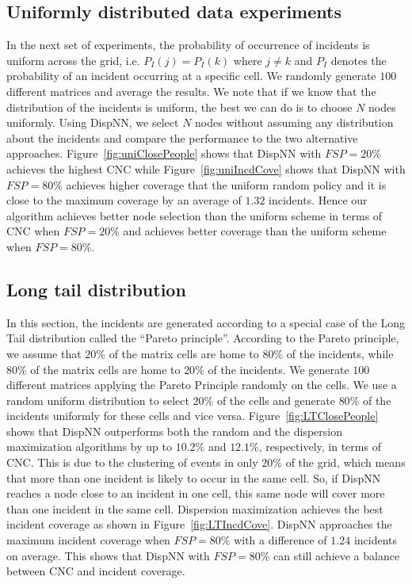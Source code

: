 \documentclass{acm_proc_article-sp}
\begin{document}
\subsection{Uniformly distributed data experiments}
In the next set of experiments, the probability of occurrence of incidents is uniform across the grid, i.e. $P_I (j) = P_I (k)$ where $j \neq k$ and $P_I$ denotes the probability of an incident occurring at a specific cell. We randomly generate $100$ different matrices and average the results. We note that if we know that the distribution of the incidents is uniform, the best we can do is to choose $N$ nodes uniformly. Using DispNN, we select $N$ nodes without assuming any distribution about the incidents and compare the performance to the two alternative approaches. Figure~\ref{fig:uniClosePeople} shows that DispNN with $FSP = 20\%$ achieves the highest CNC while Figure~\ref{fig:uniIncdCove} shows that DispNN with $FSP = 80\%$ achieves higher coverage that the uniform random policy and it is close to the maximum coverage by an average of $1.32$ incidents. Hence our algorithm achieves better node selection than the uniform scheme in terms of CNC when $FSP = 20\%$ and achieves better coverage than the uniform scheme when $FSP = 80\%$.

\subsection{Long tail distribution}
In this section, the incidents are generated according to a special case of the Long Tail distribution called the ``Pareto principle''. According to the Pareto principle, we assume that $20\%$ of the matrix cells are home to $80\%$ of the incidents, while $80\%$ of the matrix cells are home to $20\%$ of the incidents. We generate $100$ different matrices applying the Pareto Principle randomly on the cells. We use a random uniform distribution to select $20\%$ of the cells and generate $80\%$ of the incidents uniformly for these cells and vice versa. Figure~\ref{fig:LTClosePeople} shows that DispNN outperforms both the random and the dispersion maximization algorithms by up to $10.2\%$ and $12.1\%$, respectively, in terms of CNC. This is due to the clustering of events in only $20\%$ of the grid, which means that more than one incident is likely to occur in the same cell. So, if DispNN reaches a node close to an incident in one cell, this same node will cover more than one incident in the same cell. Dispersion maximization achieves the best incident coverage as shown in Figure~\ref{fig:LTIncdCove}. DispNN approaches the maximum incident coverage when $FSP = 80\%$ with a difference of $1.24$ incidents on average. This shows that DispNN with $FSP = 80\%$ can still achieve a balance between CNC and incident coverage.
\end{document}
